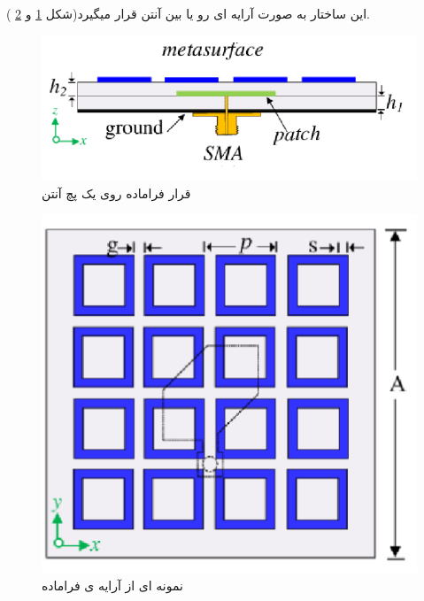 این ساختار به صورت آرایه ای رو یا بین آنتن قرار میگیرد(شکل
\ref{fig35}
و
\ref{fig36}
).

\begin{figure}
	\centering
	\includegraphics[scale=0.5]{Images/fig35.png}
	\caption{قرار فراماده روی یک پچ آنتن}
	\label{fig35}
\end{figure}

\begin{figure}
	\centering
	\includegraphics[scale=0.5]{Images/fig36.png}
	\caption{نمونه ای از آرایه ی فراماده}
	\label{fig36}
\end{figure}



